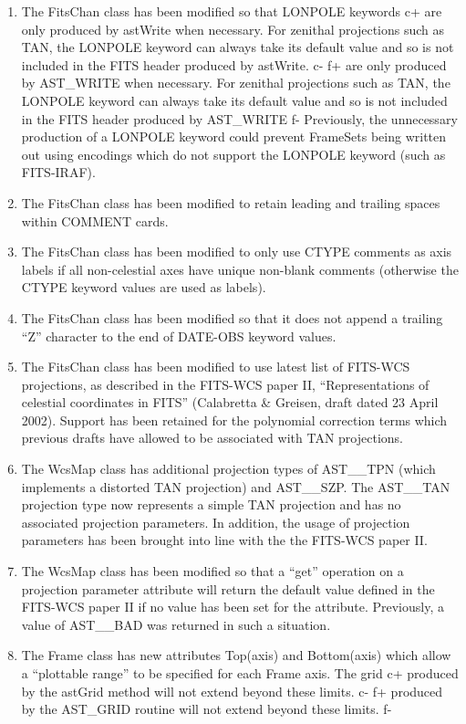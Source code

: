 \documentclass[twoside,11pt]{article}
\begin{document}
\begin{enumerate}

\item The FitsChan class has been modified so that LONPOLE keywords
c+
are only produced by astWrite when necessary. For zenithal projections such as 
TAN, the LONPOLE keyword can always take its default value and so is
not included in the FITS header produced by astWrite.
c-
f+
are only produced by AST\_WRITE when necessary. For zenithal projections such as 
TAN, the LONPOLE keyword can always take its default value and so is
not included in the FITS header produced by AST\_WRITE
f-
Previously, the unnecessary production of a LONPOLE keyword could prevent
FrameSets being written out using encodings which do not support the
LONPOLE keyword (such as FITS-IRAF).

\item The FitsChan class has been modified to retain leading and trailing
spaces within COMMENT cards.

\item The FitsChan class has been modified to only use CTYPE comments as 
axis labels if all non-celestial axes have unique non-blank comments
(otherwise the CTYPE keyword values are used as labels).

\item The FitsChan class has been modified so that it does not append a
trailing ``Z'' character to the end of DATE-OBS keyword values.

\item The FitsChan class has been modified to use latest list of FITS-WCS 
projections, as described in the FITS-WCS paper II, ``Representations of
celestial coordinates in FITS'' (Calabretta \& Greisen, draft dated 23
April 2002). Support has been retained for the polynomial correction
terms which previous drafts have allowed to be associated with TAN
projections. 

\item The WcsMap class has additional projection types of AST\_\_TPN
(which implements a distorted TAN projection) and AST\_\_SZP. The AST\_\_TAN
projection type now represents a simple TAN projection and has no 
associated projection parameters. In addition, the usage of projection 
parameters has been brought into line with the the FITS-WCS paper II. 

\item The WcsMap class has been modified so that a ``get'' operation on a
projection parameter attribute will return the default value defined in the
FITS-WCS paper II if no value has been set for the attribute. Previously, a
value of AST\_\_BAD was returned in such a situation.

\item The Frame class has new attributes Top(axis) and Bottom(axis) which
allow a ``plottable range'' to be specified for each Frame axis. The grid
c+
produced by the astGrid method will not extend beyond these limits.
c-
f+
produced by the AST\_GRID routine will not extend beyond these limits.
f-

\end{enumerate}
\end{document}

